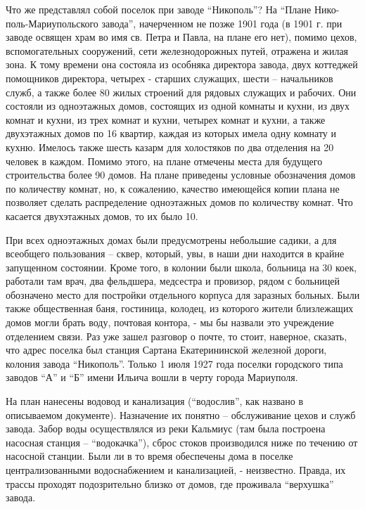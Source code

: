 
Что же представлял собой поселок при заводе \enquote{Никополь}? На \enquote{Плане
Нико\hyp{}поль-Мариупольского завода}, начерченном не позже 1901 года (в 1901 г. при
заводе освящен храм во имя св. Петра и Павла, на плане  его нет), помимо цехов,
вспомогательных сооружений, сети железнодорожных путей, отражена и жилая зона.
К тому времени она состояла из особняка директора завода, двух коттеджей
помощников директора, четырех  - старших служащих, шести  – начальников служб,
а также более 80 жилых строений для рядовых служащих и рабочих. Они состояли из
одноэтажных домов, состоящих из одной комнаты и кухни, из двух комнат и кухни,
из трех комнат и кухни, четырех комнат и кухни, а также двухэтажных домов по 16
квартир, каждая из которых имела одну комнату и кухню. Имелось также шесть
казарм для холостяков по два отделения на 20 человек в каждом. Помимо этого, на
плане отмечены места для будущего строительства более 90 домов. На плане
приведены условные обозначения домов по количеству комнат, но, к сожалению,
качество имеющейся копии плана не позволяет сделать распределение одноэтажных
домов по количеству комнат. Что касается двухэтажных домов, то их было 10.


При всех одноэтажных домах были предусмотрены небольшие садики, а для всеобщего
пользования – сквер, который, увы, в наши дни находится в крайне запущенном
состоянии. Кроме того, в колонии были школа, больница на 30 коек, работали там
врач, два фельдшера, медсестра и провизор,  рядом с больницей обозначено место
для постройки отдельного корпуса для  заразных больных. Были также общественная
баня, гостиница, колодец, из которого жители близлежащих домов могли брать
воду, почтовая контора, - мы бы назвали это учреждение отделением связи. Раз
уже зашел разговор о почте, то стоит, наверное, сказать, что адрес поселка был
станция Сартана Екатерининской железной дороги, колония завода \enquote{Никополь}.
Только 1 июля 1927 года поселки городского типа заводов \enquote{А} и \enquote{Б} имени Ильича
вошли в черту города Мариуполя.

На план нанесены водовод и канализация (\enquote{водослив}, как названо в описываемом
документе). Назначение их понятно – обслуживание цехов и служб завода. Забор
воды осуществлялся из реки Кальмиус (там была построена насосная станция –
\enquote{водокачка}), сброс стоков производился ниже по течению от насосной станции.
Были ли в то время обеспечены дома в поселке централизованными водоснабжением и
канализацией, - неизвестно. Правда, их трассы проходят подозрительно близко от
домов, где проживала  \enquote{верхушка} завода. 

